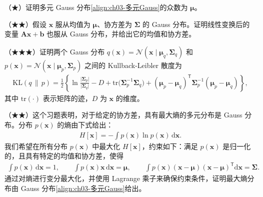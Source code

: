 \documentclass[../../main.tex]{subfiles}
\begin{document}
\begin{exercise}\label{exercise:ch03-05}
（★）证明多元 Gauss 分布\eqref{align:ch03-多元Gauss}的众数为 $\boldsymbol{\mu}$。
\end{exercise}

\begin{exercise}\label{exercise:ch03-06}
（★★）假设 $\boldsymbol{x}$ 服从均值为 $\boldsymbol{\mu}$、协方差为 $\boldsymbol{\Sigma}$ 的 Gauss 分布。证明线性变换后的变量 $\boldsymbol{A}\boldsymbol{x}+\boldsymbol{b}$ 也服从 Gauss 分布，并给出它的均值和协方差。
\end{exercise}

\begin{exercise}\label{exercise:ch03-07}
（★★★）证明两个 Gauss 分布 $q(\boldsymbol{x})=\mathcal{N}(\boldsymbol{x}\mid\boldsymbol{\mu}_{q},\boldsymbol{\Sigma}_{q})$ 和 $p(\boldsymbol{x})=\mathcal{N}(\boldsymbol{x}\mid\boldsymbol{\mu}_{p},\boldsymbol{\Sigma}_{p})$ 之间的 Kullback-Leibler 散度为
\begin{align*}
\mathrm{KL}(q\,\|\,p)=\frac{1}{2}\left\{\ln\frac{\lvert\boldsymbol{\Sigma}_{p}\rvert}{\lvert\boldsymbol{\Sigma}_{q}\rvert}-D+\mathrm{tr}\bigl(\boldsymbol{\Sigma}_{p}^{-1}\boldsymbol{\Sigma}_{q}\bigr)+(\boldsymbol{\mu}_{p}-\boldsymbol{\mu}_{q})^{\mathsf{T}}\boldsymbol{\Sigma}_{p}^{-1}(\boldsymbol{\mu}_{p}-\boldsymbol{\mu}_{q})\right\},
\end{align*}
其中 $\mathrm{tr}(\cdot)$ 表示矩阵的迹，$D$ 为 $\boldsymbol{x}$ 的维度。
\end{exercise}

\begin{exercise}\label{exercise:ch03-08}
（★★）这个习题表明，对于给定的协方差，具有最大熵的多元分布是 Gauss 分布。分布 $p(\boldsymbol{x})$ 的熵由下式给出：
\begin{align*}
H[\boldsymbol{x}]=-\int p(\boldsymbol{x})\ln p(\boldsymbol{x})\,\mathrm{d}\boldsymbol{x}.
\end{align*}
我们希望在所有分布 $p(\boldsymbol{x})$ 中最大化 $H[\boldsymbol{x}]$，约束如下：满足 $p(\boldsymbol{x})$ 是归一化的，且具有特定的均值和协方差，使得
\begin{align*}
\int p(\boldsymbol{x})\,\mathrm{d}\boldsymbol{x}=1,\qquad \int p(\boldsymbol{x})\boldsymbol{x}\,\mathrm{d}\boldsymbol{x}=\boldsymbol{\mu},\qquad \int p(\boldsymbol{x})(\boldsymbol{x}-\boldsymbol{\mu})(\boldsymbol{x}-\boldsymbol{\mu})^{\mathsf{T}}\mathrm{d}\boldsymbol{x}=\boldsymbol{\Sigma}.
\end{align*}
通过对熵进行变分最大化，并使用 Lagrange 乘子来确保约束条件，证明最大熵分布由 Gauss 分布\eqref{align:ch03-多元Gauss}给出。
\end{exercise}
\end{document}
